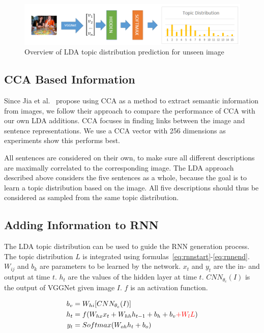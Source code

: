 \documentclass[twoside,twocolumn]{article}
\begin{document}
\begin{figure}
    \centering
    \includegraphics[width=\textwidth]{LDANetwerktranslate.png}
    \caption{Overview of LDA topic distribution prediction for unseen image}
    \label{fig:ldaprocess}
\end{figure}

\subsection{CCA Based Information}
Since Jia et al.~\cite{Fernando2015} propose using CCA as a method to extract semantic information from images, we follow their approach to compare the performance of CCA with our own LDA additions. CCA focuses in finding links between the image and sentence representations. We use a CCA vector with 256 dimensions as experiments show this performs best.

All sentences are considered on their own, to make sure all different descriptions are maximally correlated to the corresponding image. The LDA approach described above considers the five sentences as a whole, because the goal is to learn a topic distribution based on the image. All five descriptions should thus be considered as sampled from the same topic distribution.
\subsection{Adding Information to RNN}
The LDA topic distribution can be used to guide the RNN generation process. The topic distribution $L$ is integrated using formulas~\eqref{eq:rnnstart}-\eqref{eq:rnnend}. $W_{ij}$ and $b_k$ are parameters to be learned by the network. $x_t$ and $y_t$ are the in- and output at time $t$. $h_t$ are the values of the hidden layer at time $t$. $CNN_{\theta_c}(I)$ is the output of VGGNet given image $I$. $f$ is an activation function.

\begin{align}
     \vspace{-3mm}
     \label{eq:rnnstart}
     b_v&=W_{hi} [CNN_{\theta_c}(I)] \\
     \label{eq:rnn}
     h_t&=f(W_{hx} x_{t} + W_{hh} h_{t-1} + b_h + b_v \color{red}{+W_lL}\color{black}) \\
     y_t&=Softmax( W_{oh} h_t + b_o)
     \label{eq:rnnend}
\end{align}
\end{document}
